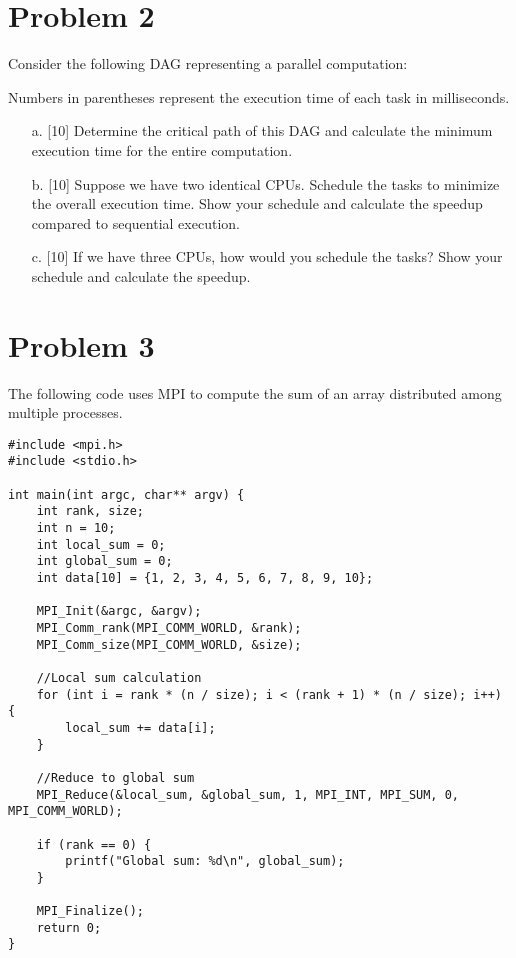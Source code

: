 \documentclass{article}
\begin{document}
\section*{Problem 2}
Consider the following DAG representing a parallel computation:

\begin{center}
\end{center}

Numbers in parentheses represent the execution time of each task in milliseconds.

\begin{enumerate}
    \item[a.] [10]  Determine the critical path of this DAG and calculate the minimum execution time for the entire computation.
    \item[b.] [10]  Suppose we have two identical CPUs. Schedule the tasks to minimize the overall execution time. Show your schedule and calculate the speedup compared to sequential execution.
    \item[c.] [10] If we have three CPUs, how would you schedule the tasks? Show your schedule and calculate the speedup.
\end{enumerate}

\section*{Problem 3}
The following code uses MPI to compute the sum of an array distributed among multiple processes.

\begin{verbatim}
#include <mpi.h>
#include <stdio.h>

int main(int argc, char** argv) {
    int rank, size;
    int n = 10;
    int local_sum = 0;
    int global_sum = 0;
    int data[10] = {1, 2, 3, 4, 5, 6, 7, 8, 9, 10};

    MPI_Init(&argc, &argv);
    MPI_Comm_rank(MPI_COMM_WORLD, &rank);
    MPI_Comm_size(MPI_COMM_WORLD, &size);

    //Local sum calculation
    for (int i = rank * (n / size); i < (rank + 1) * (n / size); i++) {
        local_sum += data[i];
    }

    //Reduce to global sum
    MPI_Reduce(&local_sum, &global_sum, 1, MPI_INT, MPI_SUM, 0, MPI_COMM_WORLD);

    if (rank == 0) {
        printf("Global sum: %d\n", global_sum);
    }

    MPI_Finalize();
    return 0;
}
\end{verbatim}
\end{document}
